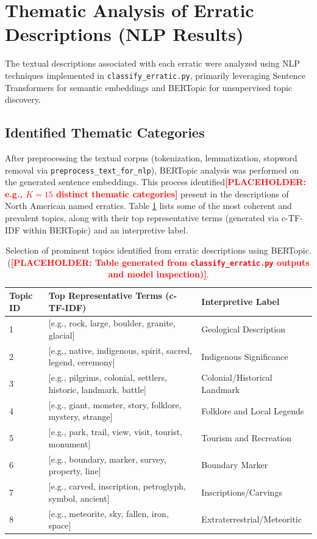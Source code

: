 \documentclass[
11pt, %
english, %
singlespacing, %
headsepline, %
]{MastersDoctoralThesis} %
\newcommand{\placeholdertext}[1]{\textcolor{red}{\textbf{[PLACEHOLDER: #1]}}}
\begin{document}
\section{Thematic Analysis of Erratic Descriptions (NLP Results)}
\label{sec:thematic_analysis_nlp}

The textual descriptions associated with each erratic were analyzed using NLP techniques implemented in \texttt{classify\_erratic.py}, primarily leveraging Sentence Transformers for semantic embeddings and BERTopic for unsupervised topic discovery.

\subsection{Identified Thematic Categories}
\label{subsec:identified_thematic_categories}
After preprocessing the textual corpus (tokenization, lemmatization, stopword removal via \texttt{preprocess\_text\_for\_nlp}), BERTopic analysis was performed on the generated sentence embeddings. This process identified\placeholdertext{e.g., $K=15$ distinct thematic categories} present in the descriptions of North American named erratics. Table \ref{tab:nlp_topics} lists some of the most coherent and prevalent topics, along with their top representative terms (generated via c-TF-IDF within BERTopic) and an interpretive label.

\begin{table}[H]
\centering
\caption{Selection of prominent topics identified from erratic descriptions using BERTopic. (\placeholdertext{Table generated from \texttt{classify\_erratic.py} outputs and model inspection)}.}
\label{tab:nlp_topics}
\begin{tabular}{@{}lll@{}}
\toprule
Topic ID & Top Representative Terms (c-TF-IDF) & Interpretive Label \\ \midrule
1 & [e.g., rock, large, boulder, granite, glacial] & Geological Description \\
2 & [e.g., native, indigenous, spirit, sacred, legend, ceremony] & Indigenous Significance \\
3 & [e.g., pilgrims, colonial, settlers, historic, landmark, battle] & Colonial/Historical Landmark \\
4 & [e.g., giant, monster, story, folklore, mystery, strange] & Folklore and Local Legends \\
5 & [e.g., park, trail, view, visit, tourist, monument] & Tourism and Recreation \\
6 & [e.g., boundary, marker, survey, property, line] & Boundary Marker \\
7 & [e.g., carved, inscription, petroglyph, symbol, ancient] & Inscriptions/Carvings \\
8 & [e.g., meteorite, sky, fallen, iron, space] & Extraterrestrial/Meteoritic \\
\bottomrule
\end{tabular}
\end{table}
\end{document}
